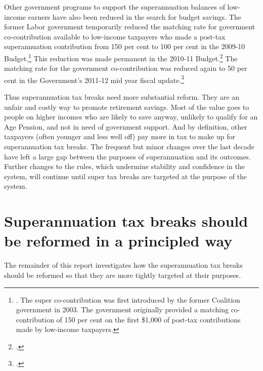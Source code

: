Other government programs to support the superannuation balances of low-income earners have also been reduced in the search for budget savings. The former Labor government temporarily reduced the matching rate for government co-contribution available to low-income taxpayers who made a post-tax superannuation contribution from 150 per cent to 100 per cent in the 2009-10 Budget.\footnote{\textcite{Treasury2009BudgetPapers0910}. The super co-contribution was first introduced by the former Coalition government in 2003. The government originally provided a matching co-contribution\DEVIATION{} of 150 per cent on the first \$1,000 of post-tax contributions made by low-income taxpayers.}   
This reduction was made permanent in the 2010-11 Budget.\footcite[][298]{Treasury2010Budget1011no2}  
The matching rate for the government co-contribution was reduced again to 50 per cent in the Government’s 2011-12 mid year fiscal update.\footcite[][291]{Treasury2011MYEFO1112} 

Thus superannuation tax breaks need more substantial reform. They are an unfair and costly way to promote retirement savings. Most of the value goes to people on higher incomes who are likely to save anyway, unlikely to qualify for an Age Pension, and not in need of government support. And by definition, other taxpayers (often younger and less well off) pay more in tax to make up for superannuation tax breaks. The frequent but minor changes over the last decade have left a large gap between the purposes of superannuation and its outcomes. Further changes to the rules, which undermine stability and confidence in the system, will continue until super tax breaks are targeted at the purpose of the system.


\section{Superannuation tax breaks should be reformed in a principled way\label{sec:SUPER-3-9}}
The remainder of this report investigates how the superannuation tax breaks should be reformed so that they are more tightly targeted at their purposes. 

